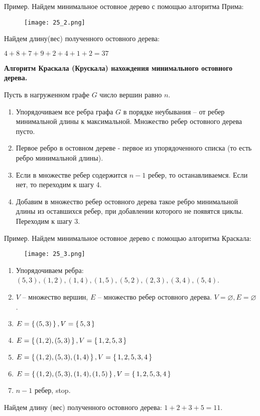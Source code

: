 Пример. Найдем минимальное остовное дерево с помощью алгоритма Прима:
\begin{figure}[h]
    \centering
    \texttt{[image: 25\_2.png]}
\end{figure}

Найдем длину(вес) полученного остовного дерева:

$4+8+7+9+2+4+1+2=37$

\newpage
\textbf{Алгоритм Краскала (Крускала) нахождения минимального остовного
дерева.}

Пусть в нагруженном графе $G$ число вершин равно $n$.
\begin{enumerate}[left=0.0em, labelsep=1em, topsep=0.0em, itemsep=0pt, parsep=0.5em]
    \item Упорядочиваем все ребра графа $G$ в порядке неубывания -- от ребер
    минимальной длины к максимальной. Множество ребер остовного дерева
    пусто.
    \item Первое ребро в остовном дереве - первое из упорядоченного списка (то
    есть ребро минимальной длины).
    \item Если в множестве ребер содержится $n-1$ ребер, то останавливаемся.
    Если нет, то переходим к шагу 4.
    \item Добавим в множество ребер остовного дерева такое ребро
    минимальной длины из оставшихся ребер, при добавлении которого не
    появятся циклы. Переходим к шагу 3.
\end{enumerate}

Пример. Найдем минимальное остовное дерево с помощью алгоритма
Краскала:
\begin{figure}[h]
    \centering
    \texttt{[image: 25\_3.png]}
\end{figure}
\begin{enumerate}[left=0.0em, labelsep=1em, topsep=0.0em, itemsep=0pt, parsep=0.5em]
    \item Упорядочиваем ребра: $(5,3), (1,2), (1,4), (1,5), (5,2), (2,3), (3,4), (5,4)$.
    \item $V$ -- множество вершин, $E$ -- множество ребер остовного дерева. $V=\varnothing,E=\varnothing$.
    \item $E = \set{(5,3)}, V = \set{5,3}$
    \item $E = \set{(1,2), (5,3)}, V = \set{1,2,5,3}$
    \item $E = \set{(1,2), (5,3), (1,4)}, V = \set{1,2,5,3,4}$
    \item $E = \set{(1,2), (5,3), (1,4), (1,5)}, V = \set{1,2,5,3,4}$
    \item $n-1$ ребер, stop.
\end{enumerate}

Найдем длину (вес) полученного остовного дерева: $1+2+3+5=11$.